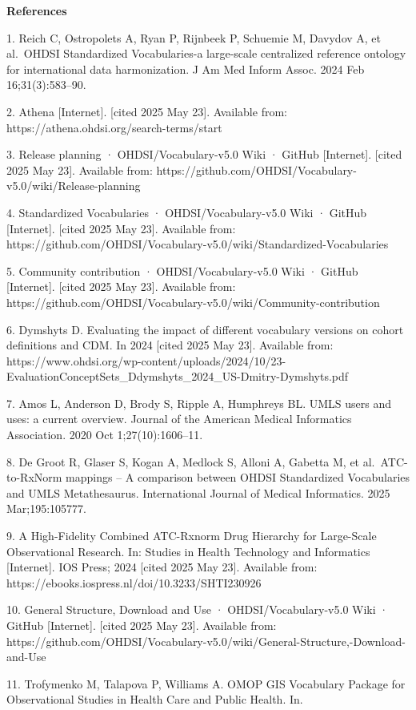 \documentclass[
  letterpaper,
  paper=7in:10in,
  pagesize=pdftex,
  headinclude=on,
  footinclude=on,
  12pt]{scrbook}
\begin{document}
\textbf{References}

1. Reich C, Ostropolets A, Ryan P, Rijnbeek P, Schuemie M, Davydov A, et
al.~OHDSI Standardized Vocabularies-a large-scale centralized reference
ontology for international data harmonization. J Am Med Inform Assoc.
2024 Feb 16;31(3):583--90.

2. Athena {[}Internet{]}. {[}cited 2025 May 23{]}. Available from:
https://athena.ohdsi.org/search-terms/start

3. Release planning · OHDSI/Vocabulary-v5.0 Wiki · GitHub
{[}Internet{]}. {[}cited 2025 May 23{]}. Available from:
https://github.com/OHDSI/Vocabulary-v5.0/wiki/Release-planning

4. Standardized Vocabularies · OHDSI/Vocabulary-v5.0 Wiki · GitHub
{[}Internet{]}. {[}cited 2025 May 23{]}. Available from:
https://github.com/OHDSI/Vocabulary-v5.0/wiki/Standardized-Vocabularies

5. Community contribution · OHDSI/Vocabulary-v5.0 Wiki · GitHub
{[}Internet{]}. {[}cited 2025 May 23{]}. Available from:
https://github.com/OHDSI/Vocabulary-v5.0/wiki/Community-contribution

6. Dymshyts D. Evaluating the impact of different vocabulary versions on
cohort definitions and CDM. In 2024 {[}cited 2025 May 23{]}. Available
from:
https://www.ohdsi.org/wp-content/uploads/2024/10/23-EvaluationConceptSets\_Ddymshyts\_2024\_US-Dmitry-Dymshyts.pdf

7. Amos L, Anderson D, Brody S, Ripple A, Humphreys BL. UMLS users and
uses: a current overview. Journal of the American Medical Informatics
Association. 2020 Oct 1;27(10):1606--11.

8. De Groot R, Glaser S, Kogan A, Medlock S, Alloni A, Gabetta M, et
al.~ATC-to-RxNorm mappings -- A comparison between OHDSI Standardized
Vocabularies and UMLS Metathesaurus. International Journal of Medical
Informatics. 2025 Mar;195:105777.

9. A High-Fidelity Combined ATC-Rxnorm Drug Hierarchy for Large-Scale
Observational Research. In: Studies in Health Technology and Informatics
{[}Internet{]}. IOS Press; 2024 {[}cited 2025 May 23{]}. Available from:
https://ebooks.iospress.nl/doi/10.3233/SHTI230926

10. General Structure, Download and Use · OHDSI/Vocabulary-v5.0 Wiki ·
GitHub {[}Internet{]}. {[}cited 2025 May 23{]}. Available from:
https://github.com/OHDSI/Vocabulary-v5.0/wiki/General-Structure,-Download-and-Use

11. Trofymenko M, Talapova P, Williams A. OMOP GIS Vocabulary Package
for Observational Studies in Health Care and Public Health. In.
\end{document}
